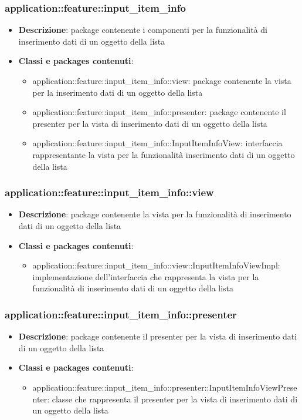 \subsubsection{application::feature::input\_item\_info}
\begin{itemize}
	\item \textbf{Descrizione}: package contenente i componenti per la funzionalità di inserimento dati di un oggetto della lista
	\item \textbf{Classi e packages contenuti}:
	\begin{itemize}
	\item application::feature::input\_item\_info::view: package contenente la vista per la inserimento dati di un oggetto della lista
	\item application::feature::input\_item\_info::presenter: package contenente il presenter per la vista di inserimento dati di un oggetto della lista
	\item application::feature::input\_item\_info::InputItemInfoView: interfaccia rappresentante la vista per la funzionalità inserimento dati di un oggetto della lista
	\end{itemize}
\end{itemize}

\subsubsection{application::feature::input\_item\_info::view}
\begin{itemize}
	\item \textbf{Descrizione}: package contenente la vista per la funzionalità di inserimento dati di un oggetto della lista
	\item \textbf{Classi e packages contenuti}:
	\begin{itemize}
	\item application::feature::input\_item\_info::view::InputItemInfoViewImpl: implementazione dell'interfaccia che rappresenta la vista per la funzionalità di inserimento dati di un oggetto della lista
	\end{itemize}
\end{itemize}

\subsubsection{application::feature::input\_item\_info::presenter}
\begin{itemize}
	\item \textbf{Descrizione}: package contenente il presenter per la vista di inserimento dati di un oggetto della lista
	\item \textbf{Classi e packages contenuti}:
	\begin{itemize}
	\item application::feature::input\_item\_info::presenter::InputItemInfoViewPresenter: classe che rappresenta il presenter per la vista di inserimento dati di un oggetto della lista
	\end{itemize}
\end{itemize}


